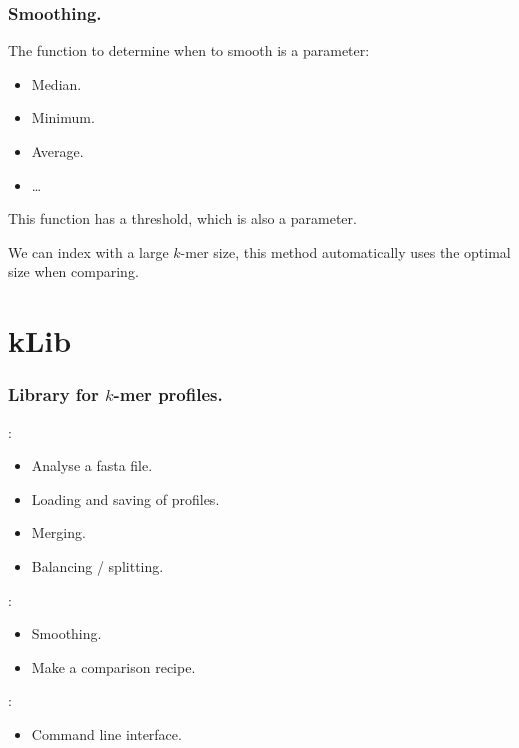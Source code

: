 \documentclass[slidestop]{beamer}
\begin{document}
\begin{frame}
  \frametitle{Smoothing.}

  The function to determine when to smooth is a parameter:

  \begin{itemize}
    \item Median.
    \item Minimum.
    \item Average.
    \item \ldots
  \end{itemize}
  \bigskip

  This function has a threshold, which is also a parameter.
  \bigskip
  \pause

  We can index with a large $k$-mer size, this method automatically uses the
  optimal size when comparing.
\end{frame}

\section{kLib}
\begin{frame}
  \frametitle{Library for $k$-mer profiles.}

  :
  \begin{itemize}
    \item Analyse a fasta file.
    \item Loading and saving of profiles.
    \item Merging.
    \item Balancing / splitting.
  \end{itemize}
  \bigskip
  \pause

  :
  \begin{itemize}
    \item Smoothing.
    \item Make a comparison recipe.
  \end{itemize}
  \bigskip
  \pause

  :
  \begin{itemize}
    \item Command line interface.
  \end{itemize}
\end{frame}
\end{document}

